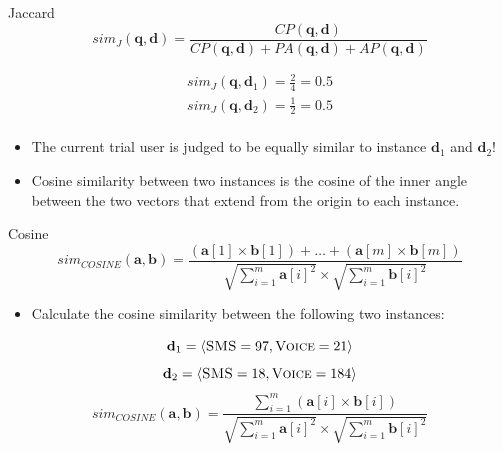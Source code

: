 \documentclass[xcolor={table}]{beamer}
\def\<{\langle}
\def\>{\rangle}
\newcommand{\featN}[1]{\textsc{#1}}
\begin{document}
 \begin{frame} 
\begin{block}{Jaccard}
\begin{equation}
sim_{J}(\mathbf{q},\mathbf{d})=\frac{CP(\mathbf{q},\mathbf{d})}{CP(\mathbf{q},\mathbf{d})+PA(\mathbf{q},\mathbf{d})+AP(\mathbf{q},\mathbf{d})}
\label{eq:jaccard}
\end{equation}
\end{block}
\begin{example}
\begin{eqnarray*}
sim_{J}(\mathbf{q},\mathbf{d}_1)=\frac{2}{4}=0.5\\
sim_{J}(\mathbf{q},\mathbf{d}_2)=\frac{1}{2}=0.5\\
\end{eqnarray*}
\begin{itemize}
	\item The current trial user is judged to be equally similar to instance $\mathbf{d}_1$ and $\mathbf{d}_2$!
\end{itemize}
\end{example}
\end{frame} 





\begin{frame}
	\begin{itemize}
	\item \alert{Cosine similarity} between two instances is the cosine of the inner angle between the two vectors that extend from the origin to each instance.
	\end{itemize}
\begin{block}{Cosine}
\begin{equation*}
sim_{COSINE}(\mathbf{a}, \mathbf{b}) = \frac{\left(\mathbf{a}[1] \times \mathbf{b}[1] \right)+ \dots + \left(\mathbf{a}[m] \times \mathbf{b}[m]\right)}{\sqrt{\sum_{i=1}^m \mathbf{a}[i]^2} \times \sqrt{\sum_{i=1}^m \mathbf{b}[i]^2}}
\label{eq:cosinesim}
\end{equation*}
\end{block}
\end{frame}


 \begin{frame} 
 \begin{itemize}
	\item Calculate the cosine similarity between the following two instances:
\end{itemize}
\begin{equation*}
	 \mathbf{d}_{1} = \< \featN{SMS} = 97, \featN{Voice} = 21 \>
\end{equation*}
\begin{equation*}
	 \mathbf{d}_{2} = \< \featN{SMS} = 18,  \featN{Voice} = 184 \>
\end{equation*}
\begin{equation*}
sim_{COSINE}(\mathbf{a}, \mathbf{b}) =  \displaystyle\frac{\sum_{i=1}^m \left(\mathbf{a}[i] \times \mathbf{b}[i]\right) }{\sqrt{\sum_{i=1}^m \mathbf{a}[i]^2} \times \sqrt{\sum_{i=1}^m \mathbf{b}[i]^2}}
\end{equation*}
\end{frame} 
\end{document}
